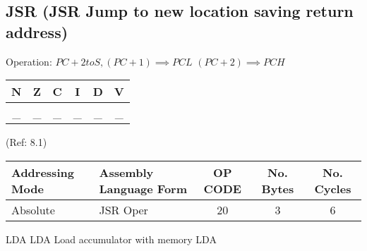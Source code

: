 \documentclass{article}
\begin{document}
  \subsection{JSR (JSR Jump to new location saving return address)}

  Operation:  $PC + 2 toS, (PC + 1) \implies PCL$
                          $(PC + 2) \implies PCH$
  \begin{table}[H]
  \centering
  \begin{tabular}{|c c c c c c|}
  \hline
  N&Z&C&I&D&V\\
  \hline
  \_ & \_ & \_ & \_ & \_ & \_\\
  \hline
  \end{tabular}
  \end{table}

                                 (Ref: 8.1)
  \begin{table}[H]
  \centering
  \begin{tabular}{|l|l|c|c|c|}
  \hline
   Addressing Mode& Assembly Language Form& OP CODE &No. Bytes&No. Cycles\\
  \hline
    Absolute      &   JSR Oper            &    20   &    3    &    6     \\
  \hline
  \end{tabular}
  \end{table}

  LDA                  LDA Load accumulator with memory                 LDA
\end{document}
